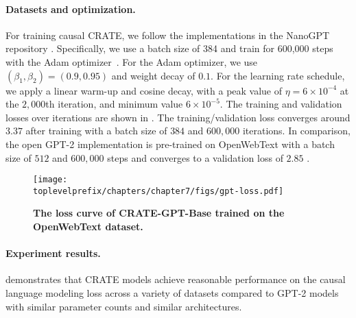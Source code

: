 \documentclass[../../book-main.tex]{subfiles}
\begin{document}
\paragraph{Datasets and optimization.} For training causal CRATE, we follow the implementations in the NanoGPT repository \citep{nanogpt}. Specifically, we use a batch size of 384 and train for 600,000 steps with the Adam optimizer~\citep{kingma2014adam}. For the Adam optimizer, we use $(\beta_1, \beta_2)=(0.9, 0.95)$ and weight decay of $0.1$. For the learning rate schedule, we apply a linear warm-up and cosine decay, with a peak value of $\eta=6\times 10^{-4}$ at the $2,000$th iteration, and minimum value $6\times 10^{-5}$. The training and validation losses over iterations are shown in . The training/validation loss converges around $3.37$ after training with a batch size of $384$ and $600,000$ iterations. In comparison, the open GPT-2 implementation is pre-trained on OpenWebText with a batch size of $512$ and $600,000$ steps and converges to a validation loss of $2.85$ \citep{nanogpt}.  

\begin{figure}
    \centering
    \texttt{[image: \\toplevelprefix/chapters/chapter7/figs/gpt-loss.pdf]}
    \caption{\bf The loss curve of CRATE-GPT-Base trained on the OpenWebText dataset.}
    \label{fig:crate-text-evals}
\end{figure}

\paragraph{Experiment results.}

 demonstrates that CRATE models achieve reasonable performance on the causal language modeling loss across a variety of datasets compared to GPT-2 models with similar parameter counts and similar architectures.
\end{document}

